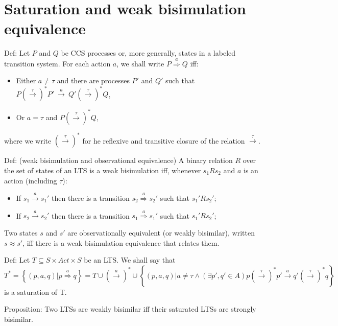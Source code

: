 \section{Saturation and weak bisimulation equivalence}
Def: Let $P$ and $Q$ be CCS processes or, more generally, states in a labeled transition system. For each action $a$, we shall write
$P\stackrel{a}{\Rightarrow}Q$ iff:
\begin{itemize}
	\item Either $a\neq\tau$ and there are processes $P'$ and $Q'$ such that $P\left(\stackrel{\tau}{\rightarrow}\right)^{*}P'\ \stackrel{a}{\rightarrow}\ Q'\left(\stackrel{\tau}{\rightarrow}\right)^{*}Q$,
	\item Or $a=\tau$ and $P\left(\stackrel{\tau}{\rightarrow}\right)^{*}Q$,
\end{itemize}
where we write $\left(\stackrel{\tau}{\rightarrow}\right)^{*}$ for he reflexive and transitive closure of the relation $\stackrel{\tau}{\rightarrow}$.

Def: (weak bisimulation and observational equivalence) A binary relation $R$ over the set of states of an LTS is a weak bisimulation iff, whenever $s_{1}Rs_{2}$ and $a$ is an action (including $\tau$):
\begin{itemize}
	\item If $s_{1}\stackrel{a}{\rightarrow}s_{1}'$ then there is a transition $s_{2}\stackrel{a}{\Rightarrow}s_{2}'$ such that $s_{1}'Rs_{2}'$;
	\item If $s_{2}\stackrel{a}{\rightarrow}s_{2}'$ then there is a transition $s_{1}\stackrel{a}{\Rightarrow}s_{1}'$ such that $s_{1}'Rs_{2}'$;
\end{itemize}

Two states $s$ and $s'$ are observationally equivalent (or weakly bisimilar), written $s\approx s'$, iff there is a weak bisimulation equivalence that relates them.

Def: Let $T\subseteq S\times Act\times S$ be an LTS. We shall say that\\ 
$T^{*}=\left\{\left(p,a,q\right)| p\stackrel{a}{\Rightarrow}q\right\}=T\cup\left(\stackrel{a}{\rightarrow}\right)^{*}\cup\left\{\left(p,a,q\right)| a\neq\tau\wedge\left(\exists p',q'\in A\right) p\left(\stackrel{\tau}{\rightarrow}\right)^{*}p'\stackrel{a}{\rightarrow}q'\left(\stackrel{\tau}{\rightarrow}\right)^{*}q\right\}$ is a saturation of T.

Proposition: Two LTSs are weakly bisimilar iff their saturated LTSs are strongly bisimilar. 

